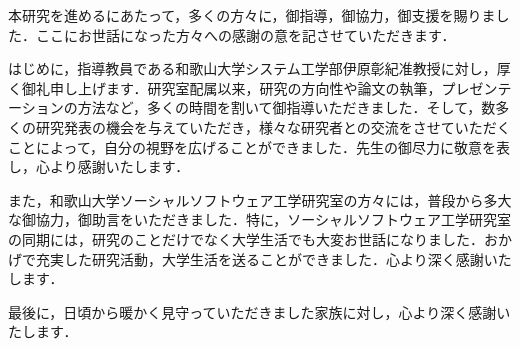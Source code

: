 \documentclass[11pt]{jreport}
\begin{document}
\begin{acknowledgements}
本研究を進めるにあたって，多くの方々に，御指導，御協力，御支援を賜りました．ここにお世話になった方々への感謝の意を記させていただきます．

はじめに，指導教員である和歌山大学システム工学部伊原彰紀准教授に対し，厚く御礼申し上げます．研究室配属以来，研究の方向性や論文の執筆，プレゼンテーションの方法など，多くの時間を割いて御指導いただきました．そして，数多くの研究発表の機会を与えていただき，様々な研究者との交流をさせていただくことによって，自分の視野を広げることができました．先生の御尽力に敬意を表し，心より感謝いたします．

また，和歌山大学ソーシャルソフトウェア工学研究室の方々には，普段から多大な御協力，御助言をいただきました．特に，ソーシャルソフトウェア工学研究室の同期には，研究のことだけでなく大学生活でも大変お世話になりました．おかげで充実した研究活動，大学生活を送ることができました．心より深く感謝いたします．

最後に，日頃から暖かく見守っていただきました家族に対し，心より深く感謝いたします．
\end{acknowledgements}








% 
% 
% 

\end{document}
